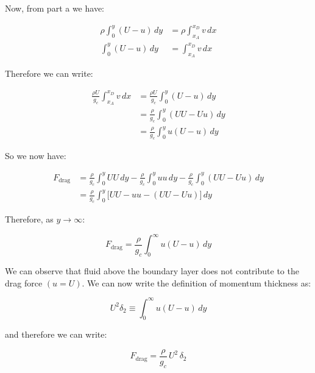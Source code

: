 \documentclass[letterpaper,12pt]{article}
\begin{document}
Now, from part a we have:

\begin{equation}
\begin{aligned}
    \rho\int_0^y(U-u)\,dy &= \rho\int_{x_A}^{x_D}v\,dx \\
    \int_0^y(U-u)\,dy     &= \int_{x_A}^{x_D}v\,dx
\end{aligned}
\end{equation}

Therefore we can write:

\begin{equation}
\begin{aligned}
    \frac{\rho U}{g_c}\int_{x_A}^{x_D}v\,dx &= \frac{\rho U}{g_c}\int_0^y(U-u)\,dy \\
                                            &= \frac{\rho}{g_c}\int_0^y(UU-Uu)\,dy \\
                                            &= \frac{\rho}{g_c}\int_0^y u(U-u)\,dy 
\end{aligned}
\end{equation}

So we now have:

\begin{equation}
\begin{aligned}
    F_{\text{drag}} &= \frac{\rho}{g_c}\int_0^y UU\,dy-\frac{\rho}{g_c}\int_0^y uu\,dy-\frac{\rho}{g_c}\int_0^y(UU-Uu)\,dy \\
                    &= \frac{\rho}{g_c}\int_0^y\Big[UU-uu-(UU-Uu)\Big]\,dy
\end{aligned}
\end{equation}

Therefore, as $y\to\infty$:

\begin{equation}
\boxed{
    F_{\text{drag}}=\frac{\rho}{g_c}\int_0^\infty u(U-u)\,dy
}
\end{equation}

We can observe that fluid above the boundary layer does not contribute to the drag force $(u = U)$. We can now write the definition of momentum thickness as:

\begin{equation}
    U^2\delta_2\equiv\int_0^\infty u(U-u)\,dy
\end{equation}

and therefore we can write:

\begin{equation}
    F_{\text{drag}}=\frac{\rho}{g_c}\,U^2\,\delta_2
\end{equation}
\end{document}
